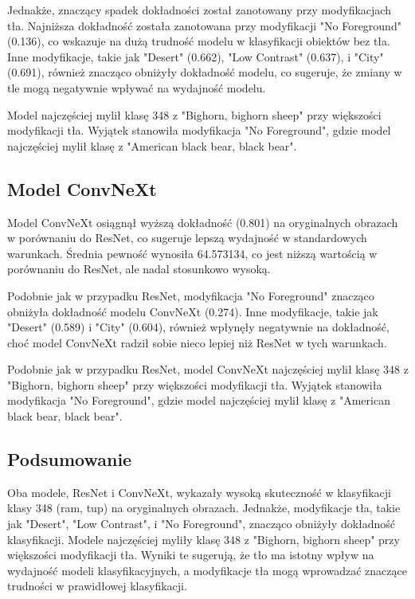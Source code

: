 Jednakże, znaczący spadek dokładności został zanotowany przy modyfikacjach tła. Najniższa dokładność została zanotowana przy 
modyfikacji "No Foreground" (0.136), co wskazuje na dużą trudność modelu w klasyfikacji obiektów bez tła. Inne modyfikacje, 
takie jak "Desert" (0.662), "Low Contrast" (0.637), i "City" (0.691), również znacząco obniżyły dokładność modelu, co sugeruje, 
że zmiany w tle mogą negatywnie wpływać na wydajność modelu.

Model najczęściej mylił klasę 348 z "Bighorn, bighorn sheep" przy większości modyfikacji tła. Wyjątek stanowiła modyfikacja 
"No Foreground", gdzie model najczęściej mylił klasę z "American black bear, black bear".

\subsection*{Model ConvNeXt}

Model ConvNeXt osiągnął wyższą dokładność (0.801) na oryginalnych obrazach w porównaniu do ResNet, co sugeruje lepszą 
wydajność w standardowych warunkach. Średnia pewność wynosiła 64.573134, co jest niższą wartością w porównaniu do ResNet, 
ale nadal stosunkowo wysoką.

Podobnie jak w przypadku ResNet, modyfikacja "No Foreground" znacząco obniżyła dokładność modelu ConvNeXt (0.274). 
Inne modyfikacje, takie jak "Desert" (0.589) i "City" (0.604), również wpłynęły negatywnie na dokładność, choć model ConvNeXt 
radził sobie nieco lepiej niż ResNet w tych warunkach.

Podobnie jak w przypadku ResNet, model ConvNeXt najczęściej mylił klasę 348 z "Bighorn, bighorn sheep" przy większości 
modyfikacji tła. Wyjątek stanowiła modyfikacja "No Foreground", gdzie model najczęściej mylił klasę z "American black bear, 
black bear".

\subsection*{Podsumowanie}

Oba modele, ResNet i ConvNeXt, wykazały wysoką skuteczność w klasyfikacji klasy 348 (ram, tup) na oryginalnych obrazach. 
Jednakże, modyfikacje tła, takie jak "Desert", "Low Contrast", i "No Foreground", znacząco obniżyły dokładność klasyfikacji. 
Modele najczęściej myliły klasę 348 z "Bighorn, bighorn sheep" przy większości modyfikacji tła. Wyniki te sugerują, że tło ma 
istotny wpływ na wydajność modeli klasyfikacyjnych, a modyfikacje tła mogą wprowadzać znaczące trudności w prawidłowej 
klasyfikacji.

